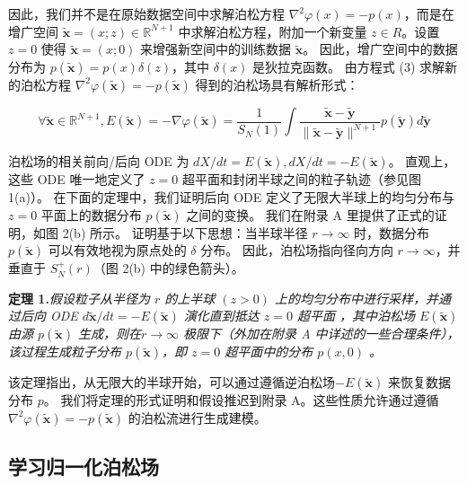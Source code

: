 \documentclass[hyperref,UTF-8]{ctexart}
\newcommand{\R}{\mathbb{R}}
\newcommand{\0}{\boldsymbol{0}}
\begin{document}
因此，我们并不是在原始数据空间中求解泊松方程 $\nabla ^2\varphi(x) = -p(x)$，而是在增广空间 $\tilde{\mathbf{x}} = (x; z) \in \R^{N+1}$ 中求解泊松方程，附加一个新变量 $z \in R$。设置 $z = 0$ 使得 $\tilde{\mathbf{x}} = (x; 0)$ 来增强新空间中的训练数据 $\tilde{\mathbf{x}}$。 因此，增广空间中的数据分布为 $p(\tilde{\mathbf{x}}) = p(x)\delta(z)$，其中 $\delta(x)$ 是狄拉克函数。 由方程式 (3) 求解新的泊松方程 $\nabla ^2\varphi(\tilde{\mathbf{x}}) = -p(\tilde{\mathbf{x}})$ 得到的泊松场具有解析形式：

\begin{equation}
    \forall \tilde{\mathbf{x}} \in \R ^{N+1},E(\tilde{\mathbf{x}}) = -\nabla\varphi(\tilde{\mathbf{x}}) = \frac{1}{S_N(1)} \int \frac{\tilde{\mathbf{x}}  -\tilde{\mathbf{y}}}{\|\tilde{\mathbf{x}} - \tilde{\mathbf{y}}\|^{N+1}} p(\tilde{\mathbf{y}}) d\tilde{\mathbf{y}} 
\end{equation}

泊松场的相关前向/后向 ODE 为 $dX/dt = E(\tilde{\mathbf{x}}), dX/dt = −E(\tilde{\mathbf{x}})$。 直观上，这些 ODE 唯一地定义了 $z = 0$ 超平面和封闭半球之间的粒子轨迹（参见图 1(a)）。 在下面的定理中，我们证明后向 ODE 定义了无限大半球上的均匀分布与 $z = 0$ 平面上的数据分布 $p(\tilde{\mathbf{x}})$ 之间的变换。 我们在附录 A 里提供了正式的证明，如图 2(b) 所示。 证明基于以下思想：当半球半径 $r \rightarrow \infty$ 时，数据分布 $p(\tilde{\mathbf{x}})$ 可以有效地视为原点处的 $\delta$ 分布。 因此，泊松场指向径向方向 $r \rightarrow \infty$，并垂直于 $S_N^+ (r)$（图 2(b) 中的绿色箭头）。

\textbf{定理 1.}\quad \textit{假设粒子从半径为 $r$ 的上半球 $(z > 0)$ 上的均匀分布中进行采样，并通过后向 ODE $\displaystyle d \tilde{\mathbf{x}}/dt = -E(\tilde{\mathbf{x}})$ 演化直到抵达 $z = 0$ 超平面 ，其中泊松场 $E(\tilde{\mathbf{x}})$ 由源 $p(\tilde{\mathbf{x}})$ 生成，则在$ r \rightarrow \infty $ 极限下（外加在附录 A 中详述的一些合理条件），该过程生成粒子分布 $p(\tilde{\mathbf{x}})$，即 $z = 0$ 超平面中的分布 $p(x,0)$ 。}

该定理指出，从无限大的半球开始，可以通过遵循逆泊松场$−E(\tilde{\mathbf{x}})$ 来恢复数据分布 $p$。 我们将定理的形式证明和假设推迟到附录 A。这些性质允许通过遵循 $\nabla^2\varphi(\tilde{\mathbf{x}}) = -p(\tilde{\mathbf{x}})$ 的泊松流进行生成建模。

\subsection{学习归一化泊松场}
\end{document}
